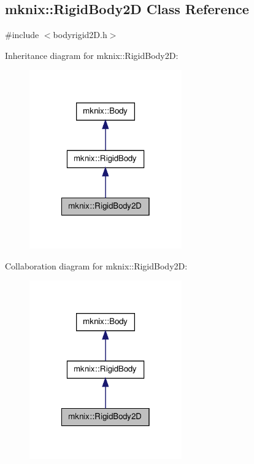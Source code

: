 \hypertarget{classmknix_1_1_rigid_body2_d}{\subsection{mknix\-:\-:Rigid\-Body2\-D Class Reference}
\label{classmknix_1_1_rigid_body2_d}
}


{\ttfamily \#include $<$bodyrigid2\-D.\-h$>$}



Inheritance diagram for mknix\-:\-:Rigid\-Body2\-D\-:\nopagebreak
\begin{figure}[H]
\begin{center}
\leavevmode
\includegraphics[width=186pt]{de/d0f/classmknix_1_1_rigid_body2_d__inherit__graph}
\end{center}
\end{figure}


Collaboration diagram for mknix\-:\-:Rigid\-Body2\-D\-:\nopagebreak
\begin{figure}[H]
\begin{center}
\leavevmode
\includegraphics[width=186pt]{d4/d4c/classmknix_1_1_rigid_body2_d__coll__graph}
\end{center}
\end{figure}
